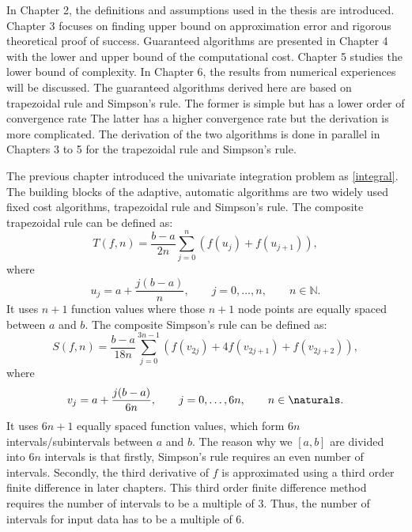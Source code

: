\documentclass{iitthesis}
\theoremstyle{definition}
\theoremstyle{remark}
\begin{document}

In Chapter 2, the definitions and assumptions used in the thesis are introduced. Chapter 3 focuses on finding upper bound on approximation error and rigorous theoretical proof of success. Guaranteed algorithms are presented in Chapter 4 with the lower and upper bound of the computational cost. Chapter 5 studies the lower bound of complexity. In Chapter 6, the results from numerical experiences will be discussed.  The guaranteed algorithms derived here are based on trapezoidal rule and Simpson's rule. The former is simple but has a lower order of convergence rate The latter has a higher convergence rate but the derivation is more complicated. The derivation of the two algorithms is done in parallel in Chapters 3 to 5 for the trapezoidal rule and Simpson's rule.

\clearpage





The previous chapter introduced the univariate integration problem as \eqref{integral}. The building blocks of the adaptive, automatic algorithms are two widely used fixed cost algorithms, trapezoidal rule and Simpson's rule.
The composite trapezoidal rule can be defined as:
\begin{equation}\label{traprule}
  T(f,n)=\frac{b-a}{2n}\sum_{j=0}^{n}(f(u_{j})+f(u_{j+1})),
\end{equation}
where
\begin{equation}\label{upts}
u_j=a+\frac{j(b-a)}{n}, \qquad j=0, \ldots, n, \qquad n\in\mathbb{N}.
\end{equation}
It uses $n+1$ function values where those $n+1$ node points are equally spaced between $a$ and $b$. The composite Simpson's rule can be defined as:
\begin{equation}\label{simrule}
  S(f,n)=\frac{b-a}{18n}\sum_{j=0}^{3n-1}(f(v_{2j})+4f(v_{2j+1})+f(v_{2j+2})),
\end{equation}
where
\begin{equation}\label{vpts}
v_j=a+\frac{j(b-a)}{6n}, \qquad j=0, \ldots, 6n, \qquad n\in \naturals.
\end{equation}
It uses $6n+1$ equally spaced function values, which form $6n$ intervals/subintervals between $a$ and $b$. The reason why we $[a,b]$ are divided into $6n$ intervals is that firstly, Simpson's rule requires an even number of intervals. Secondly, the third derivative of $f$ is approximated using a third order finite difference in later chapters. This third order finite difference method requires the number of intervals to be a multiple of 3. Thus, the number of intervals for input data has to be a multiple of 6.
\end{document}
